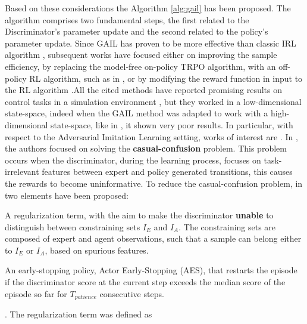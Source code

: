 Based on these considerations the Algorithm \ref{alg:gail} has been proposed. The algorithm comprises two fundamental steps, the first related to the Discriminator's parameter update and the second related to the policy's parameter update. Since GAIL has proven to be more effective than classic IRL algorithm \cite{ziebart2008maximum_entropy}, subsequent works have focused either on improving the sample efficiency, by replacing the model-free on-policy TRPO algorithm, with an off-policy RL algorithm, such as in \cite{kostrikov2018discriminator}, or by modifying the reward function in input to the RL algorithm \cite{fu2018airl,ghasemipour2020divergence_minimization_perspective}.All the cited methods have reported promising results on control tasks in a simulation environment \cite{brockman2016openai}, but they worked in a low-dimensional state-space, indeed when the GAIL method was adapted to work with a high-dimensional state-space, like in \cite{liu2018imitation_from_observation,reddy2019sqil,zolna2021task_relevant_ail,rafailov2021visual_ail}, it shown very poor results. In particular, with respect to the Adversarial Imitation Learning setting, works of interest are \cite{zolna2021task_relevant_ail,rafailov2021visual_ail}. In \cite{zolna2021task_relevant_ail}, the authors focused on solving the \textbf{casual-confusion} problem. This problem occurs when the discriminator, during the learning process, focuses on task-irrelevant features between expert and policy generated transitions, this causes the rewards to become uninformative. To reduce the casual-confusion problem, in \cite{zolna2021task_relevant_ail} two elements have been proposed: \begin{enumerate*}[label=(\textbf{\arabic*})]
    \item A regularization term, with the aim to make the discriminator \textbf{unable} to distinguish between constraining sets $I_{E}$ and $I_{A}$. The constraining sets are composed of expert and agent observations, such that a sample can belong either to $I_{E}$ or $I_{A}$, based on spurious features.  
    \item An early-stopping policy, Actor Early-Stopping (AES), that restarts the episode if the discriminator score at the current step exceeds the median score of the episode so far for $T_{patience}$ consecutive steps.
\end{enumerate*}. The regularization term was defined as
